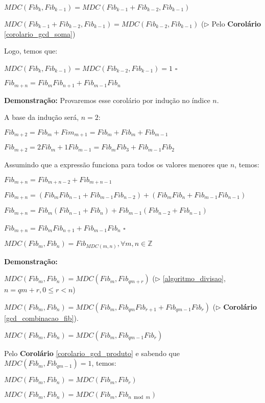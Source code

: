$MDC(Fib_{k}, Fib_{k-1}) = MDC(Fib_{k-1} + Fib_{k-2}, Fib_{k-1})$

$MDC(Fib_{k-1} + Fib_{k-2}, Fib_{k-1}) = MDC(Fib_{k-2}, Fib_{k-1})$ ($\triangleright$ Pelo \textbf{Corolário} \autoref{corolario_gcd_soma})

Logo, temos que:

$MDC(Fib_{k}, Fib_{k-1}) = MDC(Fib_{k-2}, Fib_{k-1}) = 1$ $\square$



\begin{corollary}\label{gcd_combinacao_fib}
$Fib_{m+n} = Fib_mFib_{n+1} + Fib_{m-1}Fib_n$
\end{corollary}
\textbf{Demonstração:} Provaremos esse corolário por indução no índice $n$.

A base da indução será, $n=2$:

$Fib_{m+2} = Fib_m + Fim_{m+1} = Fib_m + Fib_m + Fib_{m-1}$

$Fib_{m+2} = 2Fib_m + 1Fib_{m-1} = Fib_mFib_{3} + Fib_{m-1}Fib_2$

Assumindo que a expressão funciona para todos os valores menores que $n$, temos:

$Fib_{m+n} = Fib_{m+n-2} + Fib_{m+n-1}$

$Fib_{m+n} = (Fib_{m}Fib_{n-1} + Fib_{m-1}Fib_{n-2}) + (Fib_{m}Fib_{n} + Fib_{m-1}Fib_{n-1})$

$Fib_{m+n} = Fib_m(Fib_{n-1} + Fib_{n}) + Fib_{m-1}(Fib_{n-2} + Fib_{n-1})$

$Fib_{m+n} = Fib_mFib_{n+1} + Fib_{m-1}Fib_n$ $\square$ 


\begin{theorem}\label{fibonacci_mdc}
$MDC(Fib_m, Fib_n) = Fib_{MDC(m, n)}, \forall m, n \in \mathbb{Z}$
\end{theorem}
\textbf{Demonstração:}

$MDC(Fib_m, Fib_n) = MDC(Fib_m, Fib_{qm + r})$ ($\triangleright$ \autoref{algoritmo_divisao}, $n = qm + r, 0 \leq r < n$)

$MDC(Fib_m, Fib_n) = MDC(Fib_m, Fib_{qm}Fib_{r+1} + Fib_{qm-1}Fib_{r})$ ($\triangleright$ \textbf{Corolário} \autoref{gcd_combinacao_fib}).

$MDC(Fib_m, Fib_n) = MDC(Fib_m, Fib_{qm-1}Fib_{r})$

Pelo \textbf{Corolário} \autoref{corolario_gcd_produto} e sabendo que $MDC(Fib_m,Fib_{qm-1})=1$, temos:

$MDC(Fib_m, Fib_n) = MDC(Fib_m, Fib_{r})$

$MDC(Fib_m, Fib_n) = MDC(Fib_m, Fib_{n \bmod m})$


